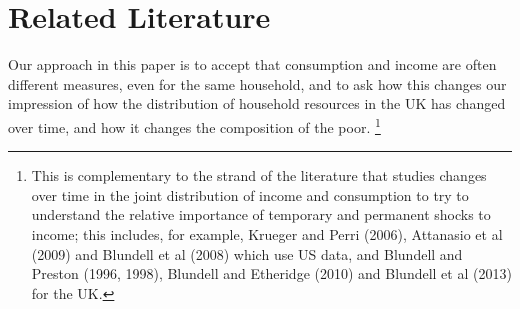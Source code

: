 \section{Related Literature}\label{sec:literature}


Our approach in this paper is to accept that consumption and income are often different measures, even for the same household, and to ask how this changes our impression of how the distribution of household resources in the UK has changed over time, and how it changes the composition of the poor. \footnote{This is complementary to the strand of the literature that studies changes over time in the joint distribution of income and consumption to try to understand the relative importance of temporary and permanent shocks to income; this includes, for example, Krueger and Perri (2006), Attanasio et al (2009) and Blundell et al (2008) which use US data, and Blundell and Preston (1996, 1998), Blundell and Etheridge (2010) and Blundell et al (2013) for the UK.} 

